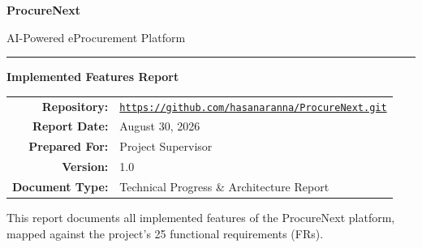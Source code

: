 \documentclass[11pt, a4paper]{article}
\begin{document}
\begin{titlepage}
    \centering
    \vspace*{2.5cm}

    {\Huge\bfseries\textcolor{primaryblue}{ProcureNext}\par}
    \vspace{0.4cm}
    {\LARGE\textcolor{accentblue}{AI-Powered eProcurement Platform}\par}

    \vspace{1.2cm}
    {\textcolor{primaryblue}{\rule{0.6\textwidth}{2pt}}\par}
    \vspace{1.2cm}

    {\huge\bfseries Implemented Features Report\par}
    \vspace{1.8cm}

    \begin{tabular}{r l}
        \textbf{Repository:}    & \href{https://github.com/hasanaranna/ProcureNext.git}{\texttt{\small https://github.com/hasanaranna/ProcureNext.git}} \\[6pt]
        \textbf{Report Date:}   & August 30, 2026 \\[6pt]
        \textbf{Prepared For:}  & Project Supervisor \\[6pt]
        \textbf{Version:}       & 1.0 \\[6pt]
        \textbf{Document Type:} & Technical Progress \& Architecture Report \\
    \end{tabular}

    \vfill

    {\small\textcolor{darktext!70}{This report documents all implemented features of the ProcureNext platform,\\
    mapped against the project's 25 functional requirements (FRs).}\par}

\end{titlepage}

\newpage
\tableofcontents
\newpage

\end{document}
